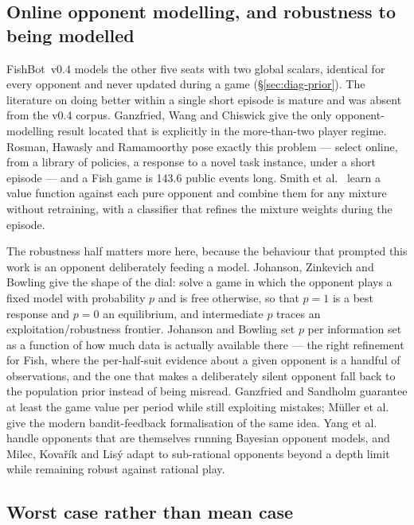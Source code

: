 \documentclass[11pt]{article}
\theoremstyle{definition}
\DeclareRobustCommand{\vfour}{\texorpdfstring{\mbox{FishBot v0.4}}{FishBot v0.4}}
\providecommand{\numMirrorEvents}{143.6}
\begin{document}
\subsection{Online opponent modelling, and robustness to being modelled}
\label{sec:related-opponent}

\vfour{} models the other five seats with two global scalars, identical for every
opponent and never updated during a game (\S\ref{sec:diag-prior}). The literature
on doing better within a single short episode is mature and was absent from the
v0.4 corpus. Ganzfried, Wang and Chiswick \cite{ganzfried-multiplayer} give the
only opponent-modelling result located that is explicitly in the more-than-two
player regime. Rosman, Hawasly and Ramamoorthy \cite{rosman-bpr} pose exactly
this problem --- select online, from a library of policies, a response to a novel
task instance, under a short episode --- and a Fish game is
\numMirrorEvents{} public events long. Smith et al.\ \cite{smith-qmixing} learn a
value function against each pure opponent and combine them for any mixture
without retraining, with a classifier that refines the mixture weights during the
episode.

The robustness half matters more here, because the behaviour that prompted this
work is an opponent deliberately feeding a model. Johanson, Zinkevich and Bowling
\cite{johanson-rnash} give the shape of the dial: solve a game in which the
opponent plays a fixed model with probability $p$ and is free otherwise, so that
$p=1$ is a best response and $p=0$ an equilibrium, and intermediate $p$ traces an
exploitation/robustness frontier. Johanson and Bowling \cite{johanson-dbr} set
$p$ per information set as a function of how much data is actually available
there --- the right refinement for Fish, where the per-half-suit evidence about a
given opponent is a handful of observations, and the one that makes a
deliberately silent opponent fall back to the population prior instead of being
misread. Ganzfried and Sandholm \cite{ganzfried-safe} guarantee at least the game
value per period while still exploiting mistakes; M\"uller et al.\
\cite{muller-bestofboth} give the modern bandit-feedback formalisation of the
same idea. Yang et al.\ \cite{yang-bayestomop} handle opponents that are
themselves running Bayesian opponent models, and Milec, Kova\v{r}\'ik and Lis\'y
\cite{milec-abd} adapt to sub-rational opponents beyond a depth limit while
remaining robust against rational play.

\subsection{Worst case rather than mean case}
\label{sec:related-worstcase}
\end{document}
